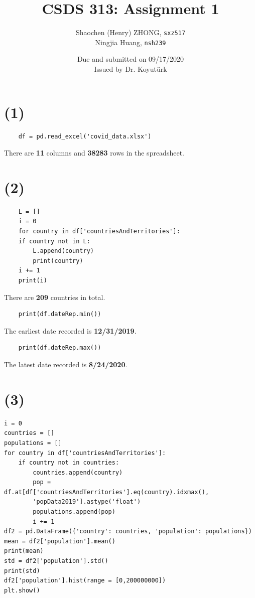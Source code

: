 \documentclass[12pt]{article}
\newcommand{\ilc}{\texttt}
\begin{document}
\title{\textbf{CSDS 313: Assignment 1}}

\author{Shaochen (Henry) ZHONG, \ilc{sxz517} \\Ningjia Huang, \ilc{nsh239}}
\date{Due and submitted on 09/17/2020 \\ Issued by Dr. Koyut{\"u}rk}
\maketitle




\section*{(1)}
\begin{lstlisting}
    df = pd.read_excel('covid_data.xlsx')
\end{lstlisting}

There are \textbf{11} columns and \textbf{38283} rows in the spreadsheet.

\section*{(2)}
\begin{lstlisting}
    L = []
    i = 0
    for country in df['countriesAndTerritories']:
    if country not in L:
        L.append(country)
        print(country)
    i += 1
    print(i)
\end{lstlisting}

There are \textbf{209} countries in total.

\begin{lstlisting}
    print(df.dateRep.min())
\end{lstlisting}

The earliest date recorded is \textbf{12/31/2019}.

\begin{lstlisting}
    print(df.dateRep.max())
\end{lstlisting}

The latest date recorded is \textbf{8/24/2020}.

\section*{(3)}
\begin{lstlisting}
i = 0
countries = []
populations = []
for country in df['countriesAndTerritories']:
    if country not in countries:
        countries.append(country)
        pop = df.at[df['countriesAndTerritories'].eq(country).idxmax(),
        'popData2019'].astype('float')
        populations.append(pop)
        i += 1
df2 = pd.DataFrame({'country': countries, 'population': populations})
mean = df2['population'].mean()
print(mean)
std = df2['population'].std()
print(std)
df2['population'].hist(range = [0,200000000])
plt.show()
\end{lstlisting}
\end{document}
